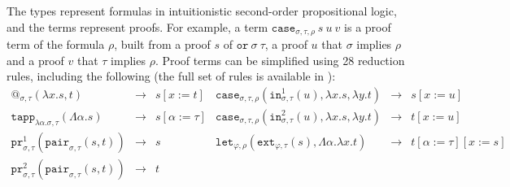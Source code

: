 \documentclass[a4paper,UKenglish,cleveref,autoref,numberwithinsect]{lipics-v2019}
\theoremstyle{definition}
\newcommand{\abs}[2]{\lambda #1.#2}
\newcommand{\tabs}[2]{\Lambda #1.#2}
\newcommand{\red}{\longrightarrow}
\newcommand{\proj}{\mathtt{pr}}
\begin{document}
The types represent formulas in intuitionistic second-order
propositional logic, and the terms represent proofs.  For example, a
term $\mathtt{case}_{\sigma,\tau,\rho}\ s\ u\ v$ is a proof term of
the formula $\rho$, built from a proof $s$ of
$\mathtt{or}\ \sigma\ \tau$, a proof $u$ that $\sigma$ implies $\rho$
and a proof $v$ that $\tau$ implies $\rho$.  Proof terms can be
simplified using 28 reduction rules, including the following (the full
set of rules is available in \cite[Appendix~B]{versionwithappendix}):
\[
\begin{array}{rclrcl}
@_{\sigma,\tau}(\abs{x}{s},t) & \red & s[x:=t] &
\mathtt{case}_{\sigma,\tau,\rho}(\mathtt{in}^1_{\sigma,\tau}(u),
  \abs{x}{s},\abs{y}{t}) & \red & s[x:=u] \\

\mathtt{tapp}_{\abs{\alpha}{\sigma},\tau}(\tabs{\alpha}{s}) & \red &
  s[\alpha:=\tau] &
\mathtt{case}_{\sigma,\tau,\rho}(\mathtt{in}^2_{\sigma,\tau}(u),
  \abs{x}{s},\abs{y}{t}) & \red & t[x:=u] \\

\proj^1_{\sigma,\tau}(\mathtt{pair}_{\sigma,\tau}(s,t)) & \red & s &
\mathtt{let}_{\varphi,\rho}(\mathtt{ext}_{\varphi,\tau}(s),\tabs{\alpha}{\abs{x}{t}}) & \red & t[\alpha:=\tau][x:=s] \\

\proj^2_{\sigma,\tau}(\mathtt{pair}_{\sigma,\tau}(s,t)) & \red & t \\
\end{array}
\]
\end{document}
